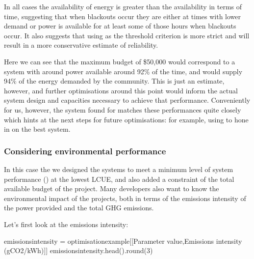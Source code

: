 \documentclass[letterpaper,10pt,english]{sphinxmanual}
\begin{document}
\noindent{}

\sphinxAtStartPar
In all cases the availability of energy is greater than the availability
in terms of time, suggesting that when blackouts occur they are either
at times with lower demand or power is available for at least some of
those hours when blackouts occur. It also suggests that using
 as the threshold criterion is more strict and will result
in a more conservative estimate of reliability.

\sphinxAtStartPar
Here we can see that the maximum budget of \$50,000 would correspond to a
system with around power available around 92\% of the time, and would
supply 94\% of the energy demanded by the community. This is just an
estimate, however, and further optimisations around this point would
inform the actual system design and capacities necessary to achieve that
performance. Conveniently for us, however, the system found for
 matches these performances quite closely
which hints at the next steps for future optimisations: for example,
using  to hone in
on the best system.


\subsubsection{Considering environmental performance}
\label{\detokenize{optimisation:considering-environmental-performance}}
\sphinxAtStartPar
In this case the we designed the systems to meet a minimum level of
system performance () at the lowest LCUE, and also added a
constraint of the total available budget of the project. Many developers
also want to know the environmental impact of the projects, both in
terms of the emissions intensity of the power provided and the total GHG
emissions.

\sphinxAtStartPar
Let’s first look at the emissions intensity:

\begin{sphinxVerbatim}[commandchars=\\\{\}]
emissions\PYGZus{}intensity = optimisation\PYGZus{}example[[\PYGZsq{}Parameter value\PYGZsq{},\PYGZsq{}Emissions intensity (gCO2/kWh)\PYGZsq{}]]
emissions\PYGZus{}intensity.head().round(3)
\end{sphinxVerbatim}
\end{document}
